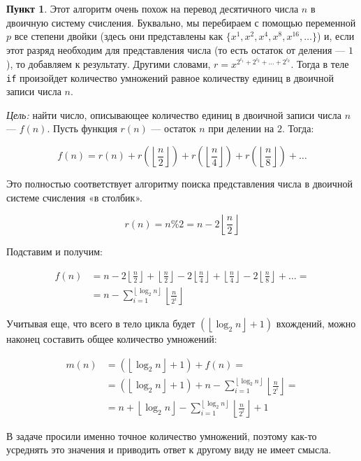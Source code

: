 \documentclass[11pt,a4paper]{scrarticle}
\theoremstyle{definition}
\newtheorem{subtask}{Пункт}
\begin{document}
\begin{subtask}
	Этот алгоритм очень похож на перевод десятичного числа $n$ в двоичную систему счисления. Буквально, мы перебираем с помощью переменной $p$ все степени двойки (здесь они представлены как $\{x^{1}, x^{2}, x^{4}, x^{8}, x^{16}, \dots\}$) и, если этот разряд необходим для представления числа (то есть остаток от деления --- $1$), то добавляем к результату. Другими словами, $r = x^{2^{i_1} + 2^{i_2} + \dots + 2^{i_k}}$. Тогда в теле \texttt{if} произойдет количество умножений равное количеству единиц в двоичной записи числа $n$.

	\emph{Цель:} найти число, описывающее количество единиц в двоичной записи числа $n$ --- $f(n)$. Пусть функция $r(n)$ --- остаток $n$ при делении на $2$. Тогда:

	$$
		f(n) = r(n) + r\left( \left\lfloor \frac{n}{2} \right\rfloor \right) + r\left( \left\lfloor \frac{n}{4} \right\rfloor \right) + r\left( \left\lfloor \frac{n}{8} \right\rfloor \right) + \dots
	$$

	Это полностью соответствует алгоритму поиска представления числа в двоичной системе счисления «в столбик».

	$$
		r(n) = n \% 2 = n - 2 \left\lfloor \frac{n}{2} \right\rfloor
	$$

	Подставим и получим:

	\begin{align*}
		f(n) & = n - 2 \left\lfloor \frac{n}{2} \right\rfloor + \left\lfloor \frac{n}{2} \right\rfloor - 2 \left\lfloor \frac{n}{4} \right\rfloor + \left\lfloor \frac{n}{4} \right\rfloor - 2 \left\lfloor \frac{n}{8} \right\rfloor + \dots = \\
		     & = n - \sum_{i = 1}^{\left\lfloor \log_2 n \right\rfloor} \left\lfloor \frac{n}{2^{i}} \right\rfloor
	\end{align*}

	Учитывая еще, что всего в тело цикла будет $\left(\left\lfloor \log_2 n \right\rfloor + 1\right)$ вхождений, можно наконец составить общее количество умножений:

	\begin{align*}
		m(n) & = \left(\left\lfloor \log_2 n \right\rfloor + 1\right) + f(n) =                                                                                              \\
		     & = \left(\left\lfloor \log_2 n \right\rfloor + 1\right) + n - \sum_{i = 1}^{\left\lfloor \log_2 n \right\rfloor} \left\lfloor \frac{n}{2^{i}} \right\rfloor = \\
		     & = n + \left\lfloor \log_2 n \right\rfloor - \sum_{i = 1}^{\left\lfloor \log_2 n \right\rfloor} \left\lfloor \frac{n}{2^{i}} \right\rfloor + 1
	\end{align*}

	В задаче просили именно точное количество умножений, поэтому как-то усреднять это значения и приводить ответ к другому виду не имеет смысла.
\end{subtask}
\end{document}
